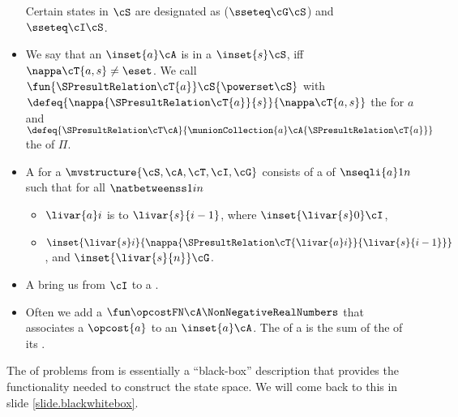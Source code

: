 \documentclass[notes,mh]{mikoslides}
\begin{document}
\begin{module}[id=search-problem]
\begin{frame}
\begin{itemize}
\begin{definition}[id=search-problem.def]
      Certain states in $\cS$ are designated as  ($\sseteq\cG\cS$) and
       $\sseteq\cI\cS$.
    \end{definition}
  \item 
    \begin{definition}
      We say that an  $\inset{a}\cA$ is  in a 
      $\inset{s}\cS$, iff $\nappa\cT{a,s}\ne\eset$. We call
      $\fun{\SPresultRelation\cT{a}}\cS{\powerset\cS}$ with
      $\defeq{\nappa{\SPresultRelation\cT{a}}{s}}{\nappa\cT{a,s}}$ the
       for $a$ and
      $\defeq{\SPresultRelation\cT\cA}{\munionCollection{a}\cA{\SPresultRelation\cT{a}}}$ the
       of $\Pi$.
    \end{definition}
  \item
    \begin{definition}[id=search-solution.def]
      A  for a  $\mvstructure{\cS,\cA,\cT,\cI,\cG}$
      consists of a  of  $\nseqli{a}1n$ such
      that for all $\natbetweenss1in$
      \begin{itemize}
      \item $\livar{a}i$ is  to 
        $\livar{s}{i-1}$, where $\inset{\livar{s}0}\cI$,
      \item $\inset{\livar{s}i}{\nappa{\SPresultRelation\cT{\livar{a}i}}{\livar{s}{i-1}}}$,
        and $\inset{\livar{s}{n}}\cG$.
      \end{itemize}
    \end{definition}
  \item
    \begin{omtext}[title=Idea]
      A  bring us from $\cI$ to a .
    \end{omtext}
  \item
    \begin{definition}
      Often we add a  $\fun\opcostFN\cA\NonNegativeRealNumbers$ that
      associates a  $\opcost{a}$ to an 
      $\inset{a}\cA$. The  of a  is the sum of the
       of its .
    \end{definition}
  \end{itemize}
\end{frame}

\begin{nomtext}[title=Observation]
  The  of problems from
   is essentially a ``black-box'' description that provides the
  functionality needed to construct the state space. We will come back to this in slide
  \ref{slide.blackwhitebox}. 
\end{nomtext}
\end{module}
\end{document}
